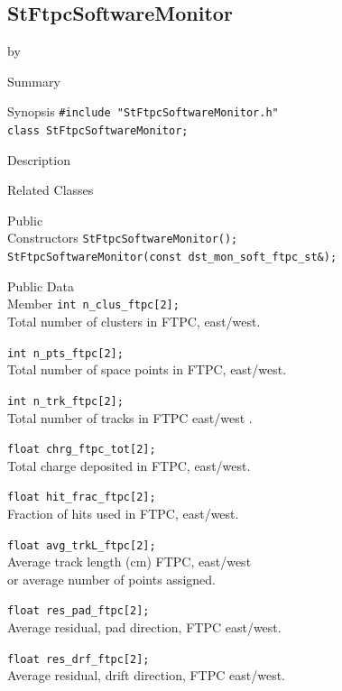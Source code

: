 \documentclass[twoside]{article}
\newcommand{\entrylabel}[1]{\mbox{\textbf{{#1}}}\hfil}%
\newenvironment{entry}
{\begin{list}{}%
    {\renewcommand{\makelabel}{\entrylabel}%
     \setlength{\labelwidth}{90pt}%
     \setlength{\leftmargin}{\labelwidth}
     \advance\leftmargin by \labelsep%
      }%
    }%
  {\end{list}}
\newcommand{\Entrylabel}[1]%
{\raisebox{0pt}[1ex][0pt]{\makebox[\labelwidth][l]%
    {\parbox[t]{\labelwidth}{\hspace{0pt}\textbf{{#1}}}}}}
\newenvironment{Entry}%
{\renewcommand{\entrylabel}{\Entrylabel}\begin{entry}}%
  {\end{entry}}
\begin{document}
\subsection{StFtpcSoftwareMonitor}
\label{sec:StFtpcSoftwareMonitor}
\begin{Entry}
\item[Summary]
\item[Synopsis]
    \verb+#include "StFtpcSoftwareMonitor.h"+\\
    \verb+class StFtpcSoftwareMonitor;+\\
\item[Description]
\item[Related Classes]
\item[Public\\ Constructors]
    \verb+StFtpcSoftwareMonitor();+\\

    \verb+StFtpcSoftwareMonitor(const dst_mon_soft_ftpc_st&);+\\
\item[Public Data\\ Member]
    \verb+int n_clus_ftpc[2];+\\
    Total number of clusters in FTPC, east/west.
    
    \verb+int n_pts_ftpc[2];+\\
    Total number of space points in FTPC, east/west.
    
    \verb+int n_trk_ftpc[2];+\\
    Total number of tracks in FTPC east/west .
    
    \verb+float chrg_ftpc_tot[2];+\\
    Total charge deposited in FTPC, east/west.
    
    \verb+float hit_frac_ftpc[2];+\\
    Fraction of hits used in FTPC, east/west.
    
    \verb+float avg_trkL_ftpc[2];+\\
    Average track length (cm) FTPC, east/west \\
    or average number of points assigned.
    
    \verb+float res_pad_ftpc[2];+\\
    Average residual, pad direction, FTPC east/west.
    
    \verb+float res_drf_ftpc[2];+\\
    Average residual, drift direction, FTPC east/west.
\end{Entry}
\clearpage
\end{document}
